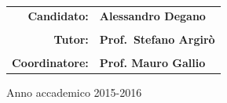 \vspace{0.75cm}
\begin{flushright}                  
\begin{tabular}{rl}
\textbf{\large Candidato:}&  \textbf{\large Alessandro Degano}\\
 & \\
\textbf{\large Tutor:}&  \textbf{\large Prof.\ Stefano Argir\`o}\\
 & \\
\textbf{\large Coordinatore:}&  \textbf{\large Prof. Mauro Gallio}
\end{tabular} 
\end{flushright}

\vspace{0.3cm}
\begin{center}
{\large Anno accademico 2015-2016}\\
\end{center}


\newpage
\thispagestyle{empty}
\mbox{}
\newpage

